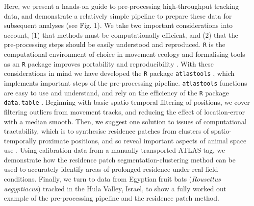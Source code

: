 \documentclass[10pt,paper=a4,headings=standardclasses
]{scrartcl}
\begin{document}
Here, we present a hands-on guide to pre-processing high-throughput tracking data, and demonstrate a relatively simple pipeline to prepare these data for subsequent analyses (see Fig. 1). 
We take two important considerations into account, (1) that methods must be computationally efficient, and (2) that the pre-processing steps should be easily understood and reproduced.
\texttt{R} is the computational environment of choice in movement ecology \citep{joo2020} and formalising tools as an \texttt{R} package improves portability and reproducibility \citep{marwick2018}.
With these considerations in mind we have developed the \texttt{R} package \texttt{atlastools} \citep{gupte2020a, rcoreteam2020}, which implements important steps of the pre-processing pipeline.
\texttt{atlastools} functions are easy to use and understand, and rely on the efficiency of the \texttt{R} package \texttt{data.table} \citep{dowle2020}.
Beginning with basic spatio-temporal filtering of positions, we cover filtering outliers from movement tracks, and reducing the effect of location-error with a median smooth.
Then, we suggest one solution to issues of computational tractability, which is to synthesise residence patches from clusters of spatio-temporally proximate positions, and so reveal important aspects of animal space use \citep[\textit{sensu}][]{bijleveld2016, oudman2018, barraquand2008}.
Using calibration data from a manually transported ATLAS tag, we demonstrate how the residence patch segmentation-clustering method can be used to accurately identify areas of prolonged residence under real field conditions.
Finally, we turn to data from Egyptian fruit bats (\textit{Rousettus aegyptiacus}) tracked in the Hula Valley, Israel, to show a fully worked out example of the pre-processing pipeline and the residence patch method.
\end{document}
